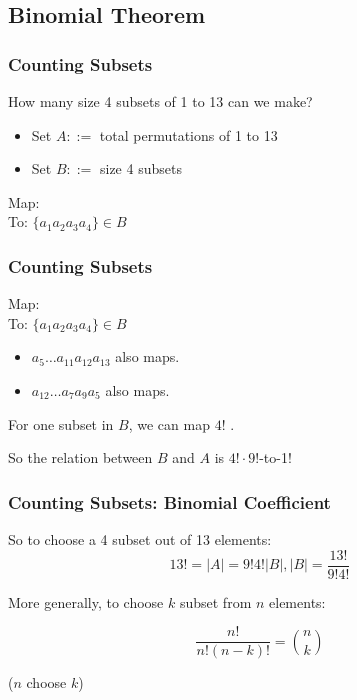 \documentclass{beamer}
\begin{document}
\subsection{Binomial Theorem}
\begin{frame}
  \frametitle{Counting Subsets}

  {\larger
    How many size 4 subsets of 1 to 13 can we make?
    \begin{itemize}
    \item Set $A ::=$ total permutations of 1 to 13
    \item Set $B ::=$ size 4 subsets
    \end{itemize}

    \bigskip

    Map: \\
    To: \alert{$\{a_1a_2a_3a_4\} \in B$}

  }
\end{frame}

\begin{frame}
  \frametitle{Counting Subsets}

  {\larger
    Map: \\
    To: \alert{$\{a_1a_2a_3a_4\} \in B$}

    \bigskip
    
    \begin{itemize}
    \item {}$a_5\ldots a_{11}a_{12}a_{13}$ also maps.
    \item {}$a_{12}\ldots a_{7}a_{9}a_{5}$ also maps.
    \end{itemize}

    \bigskip
    
    For \alert{one subset in $B$}, we can map $4!$
    .

    \vfill
    
    So the relation between $B$ and $A$ is $4!\cdot9!$-to-1!
    
  }
\end{frame}

\begin{frame}
  \frametitle{Counting Subsets: Binomial Coefficient}

  {\larger
    So to choose a 4 subset out of 13 elements:
    \begin{equation}
      13! = |A| = 9!4!|B|, |B| = \frac{13!}{9!4!}
    \end{equation}

    \vfill

    More generally, to choose $k$ subset from $n$ elements:

    \begin{equation}
      \frac{n!}{n!(n-k)!} = \binom{n}{k}
    \end{equation}

    \hfill ($n$ choose $k$)
  }
\end{frame}
\end{document}
